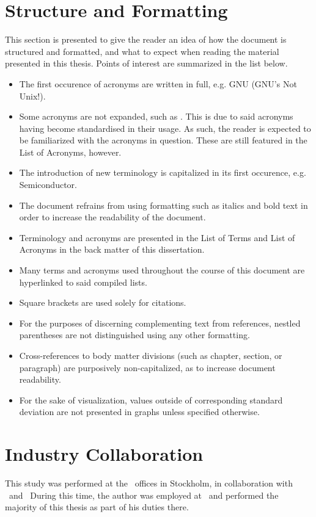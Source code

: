 \section*{Structure and Formatting}
\label{sec:preface_structureandformatting}
This section is presented to give the reader an idea of how the document is structured and formatted, and what to expect when reading the material presented in this thesis.
Points of interest are summarized in the list below.
\begin{itemize}[noitemsep]
	\item The first occurence of acronyms are written in full, e.g. GNU (GNU's Not Unix!).
	\item Some acronyms are not expanded, such as \dvttermcpu . This is due to said acronyms having become standardised in their usage. As such, the reader is expected to be familiarized with the acronyms in question. These are still featured in the List of Acronyms, however. 
	\item The introduction of new terminology is capitalized in its first occurence, e.g. Semiconductor.
	\item The document refrains from using formatting such as italics and bold text in order to increase the readability of the document.
	\item Terminology and acronyms are presented in the List of Terms and List of Acronyms in the back matter of this dissertation.
	\item Many terms and acronyms used throughout the course of this document are hyperlinked to said compiled lists.
	\item Square brackets are used solely for citations.
	\item For the purposes of discerning complementing text from references, nestled parentheses are not distinguished using any other formatting.
	\item Cross-references to body matter divisions (such as chapter, section, or paragraph) are purposively non-capitalized, as to increase document readability.
	\item For the sake of visualization, values outside of corresponding standard deviation are not presented in graphs unless specified otherwise.
\end{itemize}

\section*{Industry Collaboration}
\label{sec:preface_industrycollaboration}
This study was performed at the \dvttermintel\ offices in Stockholm, in collaboration with \dvttermintel\ and \dvttermwindriver\
During this time, the author was employed at \dvttermintel\ and performed the majority of this thesis as part of his duties there.

